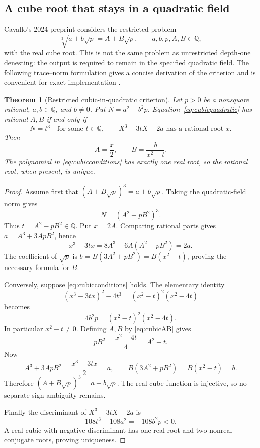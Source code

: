 \documentclass[11pt,letterpaper]{article}
\numberwithin{equation}{section}
\newtheorem{theorem}{Theorem}[section]
\theoremstyle{definition}
\theoremstyle{remark}
\newcommand{\Q}{\mathbb{Q}}
\begin{document}
\subsection{A cube root that stays in a quadratic field}\label{sec:cubicquadratic}
Cavallo's 2024 preprint considers the restricted problem
\begin{equation}\label{eq:cubicquadratic}
\sqrt[3]{a+b\sqrt p}=A+B\sqrt p,
\qquad a,b,p,A,B\in\Q,
\end{equation}
with the real cube root. This is not the same problem as unrestricted depth-one denesting: the output is required to remain in the specified quadratic field. The following trace--norm formulation gives a concise derivation of the criterion and is convenient for exact implementation \cite{cavallo}.

\begin{theorem}[Restricted cubic-in-quadratic criterion]\label{thm:cubicquadratic}
Let $p>0$ be a nonsquare rational, $a,b\in\Q$, and $b\ne0$. Put $N=a^2-b^2p$. Equation~\eqref{eq:cubicquadratic} has rational $A,B$ if and only if
\begin{equation}\label{eq:cubicconditions}
N=t^3\quad\text{for some }t\in\Q,
\qquad X^3-3tX-2a\text{ has a rational root }x.
\end{equation}
Then
\begin{equation}\label{eq:cubicAB}
A=\frac{x}{2},\qquad B=\frac{b}{x^2-t}.
\end{equation}
The polynomial in \eqref{eq:cubicconditions} has exactly one real root, so the rational root, when present, is unique.
\end{theorem}

\begin{proof}
Assume first that $(A+B\sqrt p)^3=a+b\sqrt p$. Taking the quadratic-field norm gives
\[
N=(A^2-pB^2)^3.
\]
Thus $t=A^2-pB^2\in\Q$. Put $x=2A$. Comparing rational parts gives $a=A^3+3ApB^2$, hence
\[
x^3-3tx=8A^3-6A(A^2-pB^2)=2a.
\]
The coefficient of $\sqrt p$ is $b=B(3A^2+pB^2)=B(x^2-t)$, proving the necessary formula for $B$.

Conversely, suppose \eqref{eq:cubicconditions} holds. The elementary identity
\begin{equation}\label{eq:tracecertificate}
(x^3-3tx)^2-4t^3=(x^2-t)^2(x^2-4t)
\end{equation}
becomes
\[
4b^2p=(x^2-t)^2(x^2-4t).
\]
In particular $x^2-t\ne0$. Defining $A,B$ by \eqref{eq:cubicAB} gives
\[
pB^2=\frac{x^2-4t}{4}=A^2-t.
\]
Now
\[
A^3+3ApB^2=\frac{x^3-3tx}{2}=a,
\qquad B(3A^2+pB^2)=B(x^2-t)=b.
\]
Therefore $(A+B\sqrt p)^3=a+b\sqrt p$. The real cube function is injective, so no separate sign ambiguity remains.

Finally the discriminant of $X^3-3tX-2a$ is
\[
108t^3-108a^2=-108b^2p<0.
\]
A real cubic with negative discriminant has one real root and two nonreal conjugate roots, proving uniqueness.
\end{proof}
\end{document}
